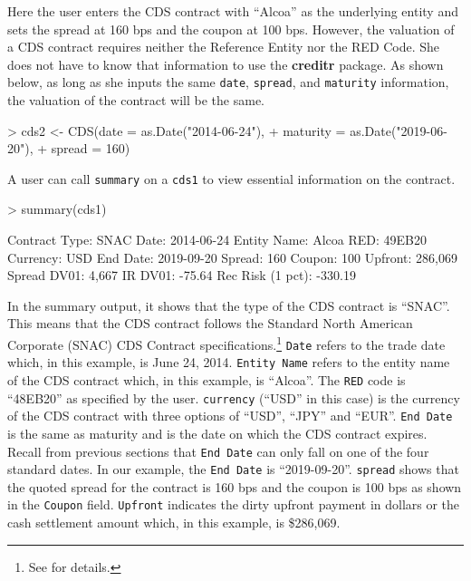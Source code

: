 \documentclass{jss}
\renewenvironment{Schunk}{\vspace{\topsep}}{\vspace{\topsep}}
\begin{document}
Here the user enters the CDS contract with ``Alcoa'' as the underlying entity and sets the spread at 160 bps and the coupon at 100 bps. However, the valuation of a CDS contract requires neither the Reference Entity nor the RED Code. She does not have to know that information to use the \textbf{creditr} package. As shown below, as long as she inputs the same \texttt{date}, \texttt{spread}, and \texttt{maturity} information, the valuation of the contract will be the same.

\begin{Schunk}
\begin{Sinput}
> cds2 <- CDS(date     = as.Date("2014-06-24"),
+             maturity = as.Date("2019-06-20"),
+             spread   = 160)
\end{Sinput}
\end{Schunk}

A user can call \texttt{summary} on a \texttt{cds1} to view essential information on the contract.

\begin{Schunk}
\begin{Sinput}
> summary(cds1)
\end{Sinput}
\begin{Soutput}
Contract Type:                      SNAC   Date:                      2014-06-24
Entity Name:                       Alcoa   RED:                           49EB20
Currency:                            USD   End Date:                  2019-09-20
Spread:                              160   Coupon:                           100
Upfront:                         286,069   Spread DV01:                    4,667
IR DV01:                          -75.64   Rec Risk (1 pct):             -330.19
\end{Soutput}
\end{Schunk}

In the summary output, it shows that the type of the CDS contract is ``SNAC''. This means that the CDS contract follows the Standard North American Corporate (SNAC) CDS Contract specifications.\footnote{See for details.}  \texttt{Date} refers to the trade date which, in this example, is June 24, 2014. \texttt{Entity Name} refers to the entity name of the CDS contract which, in this example, is ``Alcoa''. The \texttt{RED} code is ``48EB20'' as specified by the user. \texttt{currency} (``USD'' in this case) is the currency of the CDS contract with three options of ``USD'', ``JPY'' and ``EUR''. \texttt{End Date} is the same as maturity and is the date on which the CDS contract expires. Recall from previous sections that \texttt{End Date} can only fall on one of the four standard dates. In our example, the \texttt{End Date} is ``2019-09-20''. \texttt{spread} shows that the quoted spread for the contract is 160 bps and the coupon is 100 bps as shown in the \texttt{Coupon} field. \texttt{Upfront} indicates the dirty upfront payment in dollars or the cash settlement amount which, in this example, is \$286,069.
\end{document}
